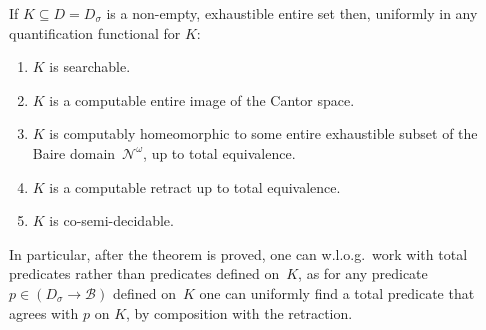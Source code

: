 \documentclass{LMCS}
\newcommand{\myomega}{\omega}
\newcommand{\pN}{\mathcal{N}}
\newcommand{\pBool}{\mathcal{B}}
\begin{document}
\begin{thm} \label{ex:main} If $K \subseteq D=D_{\sigma}$ is a
  non-empty, exhaustible entire set then, uniformly in any
  quantification functional for $K$:
  \begin{enumerate}
  \item $K$ is searchable.
  \item $K$ is a computable entire image of the Cantor space.
  \item $K$ is computably homeomorphic to some entire exhaustible
    subset of the Baire domain~$\pN^\myomega$, up to total equivalence.
  \item $K$ is a computable retract up to total equivalence.
  \item  $K$ is co-semi-decidable.
  \end{enumerate}  
\end{thm}
In particular, after the theorem is proved, one can w.l.o.g.\ work
with total predicates rather than predicates defined on~$K$, as for any
predicate $p \in (D_{\sigma} \to \pBool)$ defined on~$K$ one can
uniformly find a total predicate that agrees with $p$ on $K$, by
composition with the retraction.
\end{document}
